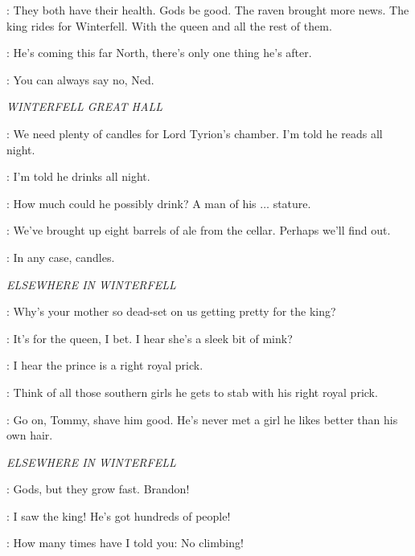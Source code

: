 \CATELYN: They both have their health. Gods be good. The raven brought more news. The king rides for Winterfell. With the queen and all the rest of them. 

\NED: He's coming this far North, there's only one thing he's after. 

\CATELYN: You can always say no, Ned. 


\scene

\textit{WINTERFELL GREAT HALL} 


\CATELYN: We need plenty of candles for Lord Tyrion's chamber. I'm told he reads all night. 

\LUWIN: I'm told he drinks all night. 

\CATELYN: How much could he possibly drink? A man of his $\ldots$ stature. 

\LUWIN: We've brought up eight barrels of ale from the cellar. Perhaps we'll find out. 

\CATELYN: In any case, candles. 


\scene

\textit{ELSEWHERE IN WINTERFELL} 


\JON: Why's your mother so dead-set on us getting pretty for the king? 

\THEON: It's for the queen, I bet. I hear she's a sleek bit of mink? 

\ROBB: I hear the prince is a right royal prick. 

\THEON: Think of all those southern girls he gets to stab with his right royal prick. 

\ROBB: Go on, Tommy, shave him good. He's never met a girl he likes better than his own hair. 


\scene

\textit{ELSEWHERE IN WINTERFELL} 


\CATELYN: Gods, but they grow fast.  Brandon! 

\BRAN: I saw the king! He's got hundreds of people! 

\CATELYN: How many times have I told you: No climbing! 

